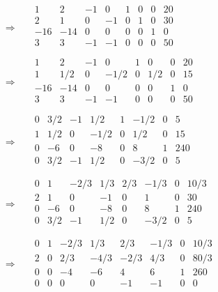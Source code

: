 \documentclass[dvipdfmx,titlepage, a4paper]{jsarticle}%
\begin{document}
\begin{eqnarray*}
	\Longrightarrow
	&&\begin{array}{cccccccc}
		1 & 2 & -1 & 0 & 1 & 0 & 0 &20\\
		2 & 1 & 0 & -1 & 0 & 1 & 0 & 30\\
		-16 & -14 & 0 & 0 & 0 & 0 & 1 & 0\\
		3 & 3 & -1 & -1 & 0 & 0 & 0 & 50\\
	\end{array}\\
	\Longrightarrow
	&&\begin{array}{cccccccc}
		1 & 2 & -1 & 0 & 1 & 0 & 0 &20\\
		1 & 1/2 & 0 & -1/2 & 0 & 1/2 & 0 & 15\\
		-16 & -14 & 0 & 0 & 0 & 0 & 1 & 0\\
		3 & 3 & -1 & -1 & 0 & 0 & 0 & 50\\
	\end{array}\\
	\Longrightarrow
	&&\begin{array}{cccccccc}
		0 & 3/2 & -1 & 1/2 & 1 & -1/2 & 0 &5\\
		1 & 1/2 & 0 & -1/2 & 0 & 1/2 & 0 & 15\\
		0 & -6 & 0 & -8 & 0 & 8 & 1 & 240\\
		0 & 3/2 & -1 & 1/2 & 0 & -3/2 & 0 & 5\\
	\end{array}\\
	\Longrightarrow
	&&\begin{array}{cccccccc}
		0 & 1 & -2/3 & 1/3 & 2/3 & -1/3 & 0 & 10/3\\
		2 & 1 & 0 & -1 & 0 & 1 & 0 & 30\\
		0 & -6 & 0 & -8 & 0 & 8 & 1 & 240\\
		0 & 3/2 & -1 & 1/2 & 0 & -3/2 & 0 & 5\\
	\end{array}\\
	\Longrightarrow
	&&\begin{array}{cccccccc}
		0 & 1 & -2/3 & 1/3 & 2/3 & -1/3 & 0 & 10/3\\
		2 & 0 & 2/3 & -4/3 & -2/3 & 4/3 & 0 & 80/3\\
		0 & 0 & -4 & -6 & 4 & 6 & 1 & 260\\
		0 & 0 & 0 & 0 & -1 & -1 & 0 & 0\\
	\end{array}\\
\end{eqnarray*}
\end{document}
